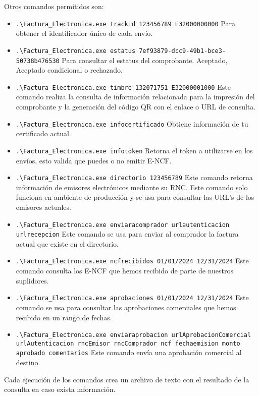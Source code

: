 \documentclass{article}
\begin{document}
Otros comandos permitidos son:
\begin{itemize}
    \item \texttt{.\textbackslash Factura\_Electronica.exe trackid 123456789 E32000000000} Para obtener el identificador único de cada envío.
    \item \texttt{.\textbackslash Factura\_Electronica.exe estatus 7ef93879-dcc9-49b1-bce3-50738b476530} Para consultar el estatus del comprobante. Aceptado, Aceptado condicional o rechazado.
    \item \texttt{.\textbackslash Factura\_Electronica.exe timbre 132071751 E32000001000} Este comando realiza la consulta de información relacionada para la impresión del comprobante y la generación del código QR con el enlace o URL de consulta.
    \item \texttt{.\textbackslash Factura\_Electronica.exe infocertificado} Obtiene información de tu certificado actual.
    \item \texttt{.\textbackslash Factura\_Electronica.exe infotoken} Retorna el token a utilizarse en los envíos, esto valida que puedes o no emitir E-NCF.
    \item \texttt{.\textbackslash Factura\_Electronica.exe directorio 123456789} Este comando retorna información de emisores electrónicos mediante su RNC. Este comando solo funciona en ambiente de producción y se usa para consultar las URL’s de los emisores actuales.
    \item \texttt{.\textbackslash Factura\_Electronica.exe enviaracomprador urlautenticacion urlrecepcion} Este comando se usa para enviar al comprador la factura actual que existe en el directorio.
    \item \texttt{.\textbackslash Factura\_Electronica.exe ncfrecibidos 01/01/2024 12/31/2024} Este comando consulta los E-NCF que hemos recibido de parte de nuestros suplidores.
    \item \texttt{.\textbackslash Factura\_Electronica.exe aprobaciones 01/01/2024 12/31/2024} Este comando se usa para consultar las aprobaciones comerciales que hemos recibido en un rango de fechas.
    \item \texttt{.\textbackslash Factura\_Electronica.exe enviaraprobacion urlAprobacionComercial urlAutenticacion rncEmisor rncComprador ncf fechaemision monto aprobado comentarios} Este comando envía una aprobación comercial al destino.
\end{itemize}

Cada ejecución de los comandos crea un archivo de texto con el resultado de la consulta en caso exista información.
\end{document}
